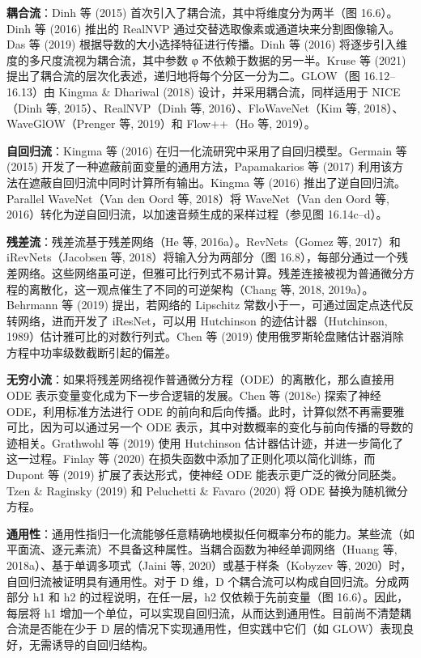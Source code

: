 \textbf{耦合流}：Dinh 等 (2015) 首次引入了耦合流，其中将维度分为两半（图 16.6）。Dinh 等 (2016) 推出的 RealNVP 通过交替选取像素或通道块来分割图像输入。Das 等 (2019) 根据导数的大小选择特征进行传播。Dinh 等 (2016) 将逐步引入维度的多尺度流视为耦合流，其中参数 φ 不依赖于数据的另一半。Kruse 等 (2021) 提出了耦合流的层次化表述，递归地将每个分区一分为二。GLOW（图 16.12–16.13）由 Kingma & Dhariwal (2018) 设计，并采用耦合流，同样适用于 NICE（Dinh 等, 2015）、RealNVP（Dinh 等, 2016）、FloWaveNet（Kim 等, 2018）、WaveGlOW（Prenger 等, 2019）和 Flow++（Ho 等, 2019）。

\textbf{自回归流}：Kingma 等 (2016) 在归一化流研究中采用了自回归模型。Germain 等 (2015) 开发了一种遮蔽前面变量的通用方法，Papamakarios 等 (2017) 利用该方法在遮蔽自回归流中同时计算所有输出。Kingma 等 (2016) 推出了逆自回归流。Parallel WaveNet（Van den Oord 等, 2018）将 WaveNet（Van den Oord 等, 2016）转化为逆自回归流，以加速音频生成的采样过程（参见图 16.14c–d）。

\textbf{残差流}：残差流基于残差网络（He 等, 2016a）。RevNets（Gomez 等, 2017）和 iRevNets（Jacobsen 等, 2018）将输入分为两部分（图 16.8），每部分通过一个残差网络。这些网络虽可逆，但雅可比行列式不易计算。残差连接被视为普通微分方程的离散化，这一观点催生了不同的可逆架构（Chang 等, 2018, 2019a）。Behrmann 等 (2019) 提出，若网络的 Lipschitz 常数小于一，可通过固定点迭代反转网络，进而开发了 iResNet，可以用 Hutchinson 的迹估计器（Hutchinson, 1989）估计雅可比的对数行列式。Chen 等 (2019) 使用俄罗斯轮盘赌估计器消除方程中功率级数截断引起的偏差。

\textbf{无穷小流}：如果将残差网络视作普通微分方程（ODE）的离散化，那么直接用 ODE 表示变量变化成为下一步合逻辑的发展。Chen 等 (2018e) 探索了神经 ODE，利用标准方法进行 ODE 的前向和后向传播。此时，计算似然不再需要雅可比，因为可以通过另一个 ODE 表示，其中对数概率的变化与前向传播的导数的迹相关。Grathwohl 等 (2019) 使用 Hutchinson 估计器估计迹，并进一步简化了这一过程。Finlay 等 (2020) 在损失函数中添加了正则化项以简化训练，而 Dupont 等 (2019) 扩展了表达形式，使神经 ODE 能表示更广泛的微分同胚类。Tzen & Raginsky (2019) 和 Peluchetti & Favaro (2020) 将 ODE 替换为随机微分方程。

\textbf{通用性}：通用性指归一化流能够任意精确地模拟任何概率分布的能力。某些流（如平面流、逐元素流）不具备这种属性。当耦合函数为神经单调网络（Huang 等, 2018a）、基于单调多项式（Jaini 等, 2020）或基于样条（Kobyzev 等, 2020）时，自回归流被证明具有通用性。对于 D 维，D 个耦合流可以构成自回归流。分成两部分 h1 和 h2 的过程说明，在任一层，h2 仅依赖于先前变量（图 16.6）。因此，每层将 h1 增加一个单位，可以实现自回归流，从而达到通用性。目前尚不清楚耦合流是否能在少于 D 层的情况下实现通用性，但实践中它们（如 GLOW）表现良好，无需诱导的自回归结构。

